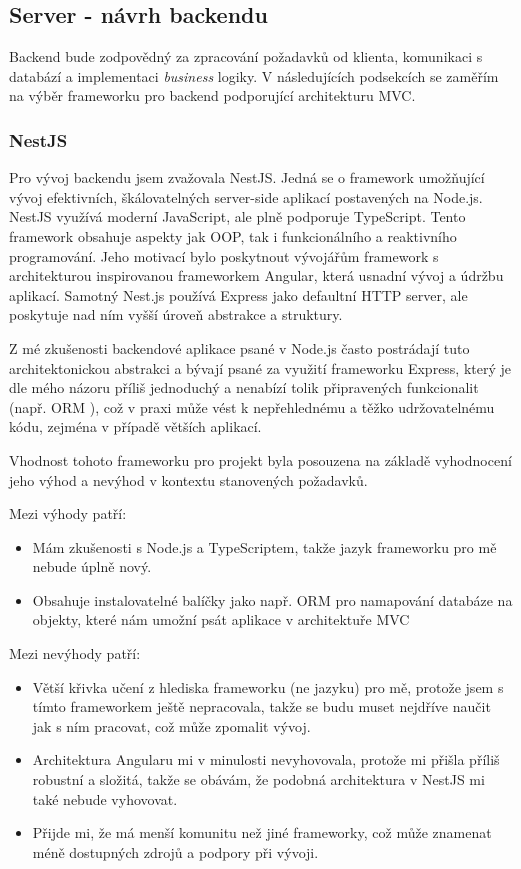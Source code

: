 \subsection{Server - návrh backendu}
Backend bude zodpovědný za zpracování požadavků od klienta, komunikaci s databází a implementaci \textit{business} logiky. V následujících podsekcích se zaměřím na výběr frameworku pro backend podporující architekturu MVC.

\subsubsection{NestJS}
Pro vývoj backendu jsem zvažovala NestJS. Jedná se o framework umožňující vývoj efektivních, škálovatelných server-side aplikací postavených na Node.js. NestJS využívá moderní JavaScript, ale plně podporuje TypeScript. Tento framework obsahuje aspekty jak OOP, tak i funkcionálního a reaktivního programování. Jeho motivací bylo poskytnout vývojářům framework s architekturou inspirovanou frameworkem Angular, která usnadní vývoj a údržbu aplikací. Samotný Nest.js používá Express jako defaultní HTTP server, ale poskytuje nad ním vyšší úroveň abstrakce a struktury. \cite{nestjs_docs}

Z mé zkušenosti backendové aplikace psané v Node.js často postrádají tuto architektonickou abstrakci a bývají psané za využití frameworku Express, který je dle mého názoru příliš jednoduchý a nenabízí tolik připravených funkcionalit (např. ORM \cite{nestjs_database_techniques}), což v praxi může vést k nepřehlednému a těžko udržovatelnému kódu, zejména v případě větších aplikací. 

Vhodnost tohoto frameworku pro projekt byla posouzena na základě vyhodnocení jeho výhod a nevýhod v kontextu stanovených požadavků.

Mezi výhody patří:
\begin{itemize}
    \item Mám zkušenosti s Node.js a TypeScriptem, takže jazyk frameworku pro mě nebude úplně nový.
    \item Obsahuje instalovatelné balíčky jako např. ORM \cite{nestjs_database_techniques} pro namapování databáze na objekty, které nám umožní psát aplikace v architektuře MVC
\end{itemize}

Mezi nevýhody patří:
\begin{itemize}
    \item Větší křivka učení z hlediska frameworku (ne jazyku) pro mě, protože jsem s tímto frameworkem ještě nepracovala, takže se budu muset nejdříve naučit jak s ním pracovat, což může zpomalit vývoj.
    \item Architektura Angularu mi v minulosti nevyhovovala, protože mi přišla příliš robustní a složitá, takže se obávám, že podobná architektura v NestJS mi také nebude vyhovovat.
    \item Přijde mi, že má menší komunitu než jiné frameworky, což může znamenat méně dostupných zdrojů a podpory při vývoji.
\end{itemize}

